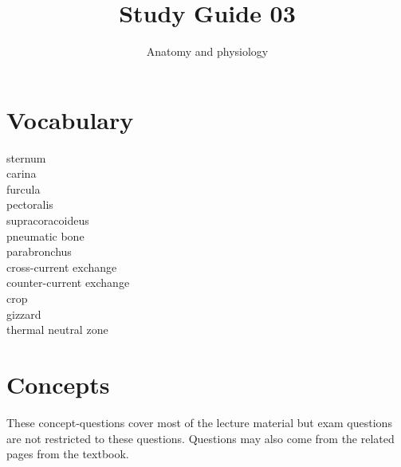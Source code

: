 \documentclass[nofonts, letterpaper]{tufte-handout}
\title{Study Guide 03}
\author{Anatomy and physiology}
\date{} %
\begin{document}
\maketitle	%


\section{Vocabulary}
\vspace{-1\baselineskip}
\begin{multicols}{2}
\noindent sternum \\
carina \\
furcula \\
pectoralis \\
supracoracoideus \\
pneumatic bone \\
parabronchus \\
cross-current exchange \\
counter-current exchange  \\
crop \\
gizzard \\
thermal neutral zone 
\end{multicols}

\section{Concepts}

These concept-questions cover most of the lecture material but exam questions are not restricted to these questions. Questions may also come from the related pages from the textbook.\vspace{\baselineskip}
\end{document}
